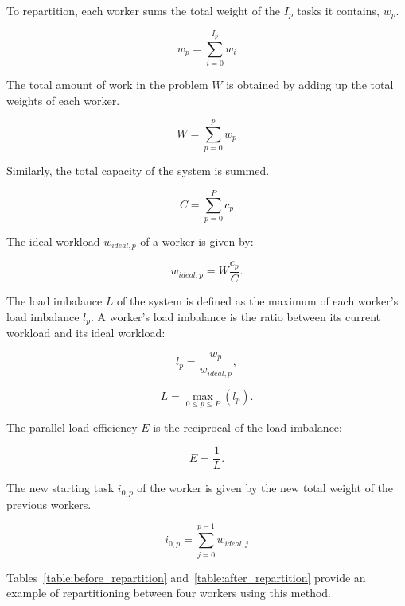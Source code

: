 To repartition, each worker sums the total weight of the \(I_p\) tasks it contains, \(w_p\).

\begin{equation}
	w_p = \sum_{i = 0}^{I_p}w_i
\end{equation}

\noindent
The total amount of work in the problem \(W\) is obtained by adding up the total weights of each
worker.

\begin{equation}
	W = \sum_{p = 0}^{p}w_p
\end{equation}

\noindent
Similarly, the total capacity of the system is summed.

\begin{equation}
	C = \sum_{p = 0}^{P}c_p
\end{equation}

\noindent
The ideal workload \(w_{ideal,p}\) of a worker is given by:

\begin{equation} \label{equ:ideal_workload}
	w_{ideal,p} = W \frac{c_p}{C}.
\end{equation}

The load imbalance \(L\) of the system is defined as the maximum of each worker's load imbalance
\(l_p\). A worker's load imbalance is the ratio between its current workload and its ideal workload:

\begin{equation}
	l_{p} = \frac{w_p}{w_{ideal,p}},
\end{equation}

\begin{equation} \label{equ:load_imbalance}
	L = \max_{0 \leq p \leq P}{(l_{p})}.
\end{equation}

\noindent
The parallel load efficiency \(E\) is the reciprocal of the load imbalance:

\begin{equation}
	E = \frac{1}{L}.
\end{equation}

The new starting task \(i_{0, p}\) of the worker is given by the new total weight of the previous
workers.

\begin{equation}
	i_{0, p} = \sum_{j = 0}^{p - 1}w_{ideal,j}
\end{equation}

Tables~\ref{table:before_repartition} and~\ref{table:after_repartition} provide an example of
repartitioning between four workers using this method.

